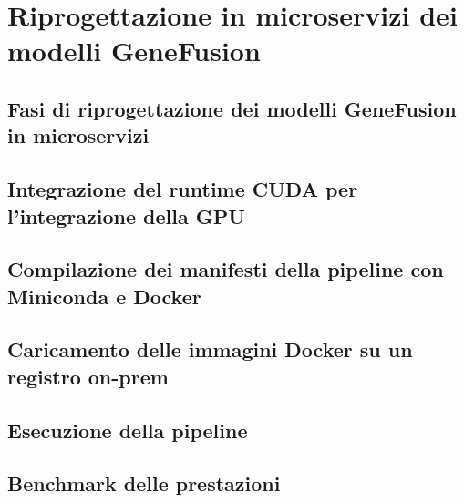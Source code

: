% 
% 
% 



\clearpage
\cleardoublepage

\chapter{Riprogettazione in microservizi dei modelli GeneFusion}

\section{Fasi di riprogettazione dei modelli GeneFusion in microservizi}

\section{Integrazione del runtime CUDA per l'integrazione della GPU}

\section{Compilazione dei manifesti della pipeline con Miniconda e Docker}

\section{Caricamento delle immagini Docker su un registro on-prem}

\section{Esecuzione della pipeline}

\section{Benchmark delle prestazioni}